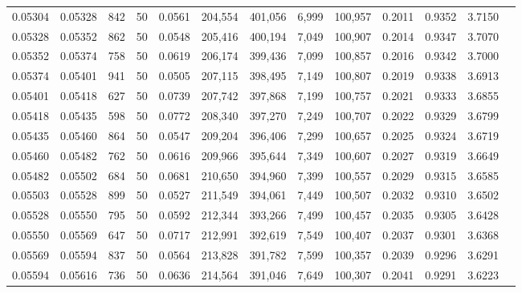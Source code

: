 \begin{tabular}{rrrrrrrrrrrrr}
0.05304 & 0.05328 &   842 &  50 &                                     0.0561 & 204,554 & 401,056 &   6,999 & 100,957 & 0.2011 & 0.9352 & 3.7150 \\
0.05328 & 0.05352 &   862 &  50 &                                     0.0548 & 205,416 & 400,194 &   7,049 & 100,907 & 0.2014 & 0.9347 & 3.7070 \\
0.05352 & 0.05374 &   758 &  50 &                                     0.0619 & 206,174 & 399,436 &   7,099 & 100,857 & 0.2016 & 0.9342 & 3.7000 \\
0.05374 & 0.05401 &   941 &  50 &                                     0.0505 & 207,115 & 398,495 &   7,149 & 100,807 & 0.2019 & 0.9338 & 3.6913 \\
0.05401 & 0.05418 &   627 &  50 &                                     0.0739 & 207,742 & 397,868 &   7,199 & 100,757 & 0.2021 & 0.9333 & 3.6855 \\
0.05418 & 0.05435 &   598 &  50 &                                     0.0772 & 208,340 & 397,270 &   7,249 & 100,707 & 0.2022 & 0.9329 & 3.6799 \\
0.05435 & 0.05460 &   864 &  50 &                                     0.0547 & 209,204 & 396,406 &   7,299 & 100,657 & 0.2025 & 0.9324 & 3.6719 \\
0.05460 & 0.05482 &   762 &  50 &                                     0.0616 & 209,966 & 395,644 &   7,349 & 100,607 & 0.2027 & 0.9319 & 3.6649 \\
0.05482 & 0.05502 &   684 &  50 &                                     0.0681 & 210,650 & 394,960 &   7,399 & 100,557 & 0.2029 & 0.9315 & 3.6585 \\
0.05503 & 0.05528 &   899 &  50 &                                     0.0527 & 211,549 & 394,061 &   7,449 & 100,507 & 0.2032 & 0.9310 & 3.6502 \\
0.05528 & 0.05550 &   795 &  50 &                                     0.0592 & 212,344 & 393,266 &   7,499 & 100,457 & 0.2035 & 0.9305 & 3.6428 \\
0.05550 & 0.05569 &   647 &  50 &                                     0.0717 & 212,991 & 392,619 &   7,549 & 100,407 & 0.2037 & 0.9301 & 3.6368 \\
0.05569 & 0.05594 &   837 &  50 &                                     0.0564 & 213,828 & 391,782 &   7,599 & 100,357 & 0.2039 & 0.9296 & 3.6291 \\
0.05594 & 0.05616 &   736 &  50 &                                     0.0636 & 214,564 & 391,046 &   7,649 & 100,307 & 0.2041 & 0.9291 & 3.6223 \\

\end{tabular}

